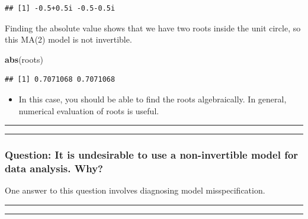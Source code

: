 \documentclass[]{article}
\newenvironment{Shaded}{\begin{snugshade}}{\end{snugshade}}
\newcommand{\KeywordTok}[1]{\textcolor[rgb]{0.13,0.29,0.53}{\textbf{#1}}}
\newcommand{\NormalTok}[1]{#1}
\providecommand{\tightlist}{%
  \setlength{\itemsep}{0pt}\setlength{\parskip}{0pt}}
\begin{document}
\begin{verbatim}
## [1] -0.5+0.5i -0.5-0.5i
\end{verbatim}

Finding the absolute value shows that we have two roots inside the unit
circle, so this MA(2) model is not invertible.

\begin{Shaded}
\begin{Highlighting}[]
\KeywordTok{abs}\NormalTok{(roots)}
\end{Highlighting}
\end{Shaded}

\begin{verbatim}
## [1] 0.7071068 0.7071068
\end{verbatim}

\begin{itemize}
\tightlist
\item
  In this case, you should be able to find the roots algebraically. In
  general, numerical evaluation of roots is useful.
\end{itemize}

\begin{center}\rule{0.5\linewidth}{\linethickness}\end{center}

\begin{center}\rule{0.5\linewidth}{\linethickness}\end{center}

\subsubsection{Question: It is undesirable to use a non-invertible model
for data analysis.
Why?}\label{question-it-is-undesirable-to-use-a-non-invertible-model-for-data-analysis.-why}

One answer to this question involves diagnosing model misspecification.


\begin{center}\rule{0.5\linewidth}{\linethickness}\end{center}

\begin{center}\rule{0.5\linewidth}{\linethickness}\end{center}
\end{document}
